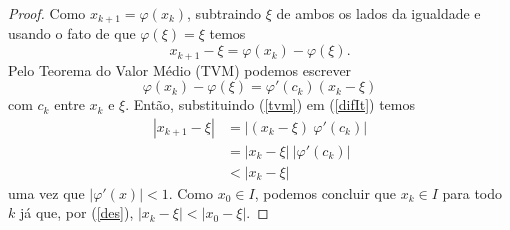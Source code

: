 \begin{proof}
Como $x_{k+1} = \varphi(x_k)$, subtraindo $\xi$ de ambos os lados da igualdade e usando o fato de que $\varphi(\xi)=\xi$ temos
    \begin{equation}\label{difIt}
        x_{k+1} - \xi = \varphi(x_k) - \varphi(\xi).
    \end{equation}
    Pelo Teorema do Valor Médio (TVM) podemos escrever \\
    \begin{equation}\label{tvm}
        \varphi(x_k) - \varphi(\xi) = \varphi'(c_k) (x_k - \xi)
    \end{equation}
    com $c_k$ entre $x_k$ e $\xi$. Então, substituindo (\ref{tvm}) em (\ref{difIt}) temos %
    \begin{align}\label{des}
        |x_{k+1} - \xi| &= |(x_k - \xi) \ \varphi'(c_k)| \nonumber \\
        &= |x_k - \xi| \ |\varphi'(c_k)| \\
        &< |x_k - \xi| \nonumber
    \end{align} %
    uma vez que $|\varphi'(x)| < 1$. Como $x_0 \in I$, podemos concluir que $x_k \in I$ para todo $k$ já que, por (\ref{des}), $|x_k - \xi| < |x_0 - \xi|$. %


\end{proof}
